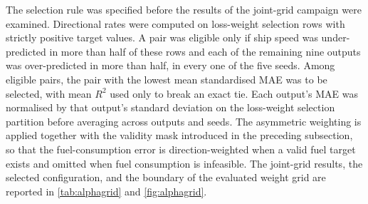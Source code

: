 \documentclass[final,5p,times,twocolumn,numbers]{elsarticle}
\begin{document}
The selection rule was specified before the results of the joint-grid campaign were examined. Directional rates were computed on loss-weight selection rows with strictly positive target values. A pair was eligible only if ship speed was under-predicted in more than half of these rows and each of the remaining nine outputs was over-predicted in more than half, in every one of the five seeds. Among eligible pairs, the pair with the lowest mean standardised MAE was to be selected, with mean $R^2$ used only to break an exact tie. Each output's MAE was normalised by that output's standard deviation on the loss-weight selection partition before averaging across outputs and seeds. The asymmetric weighting is applied together with the validity mask introduced in the preceding subsection, so that the fuel-consumption error is direction-weighted when a valid fuel target exists and omitted when fuel consumption is infeasible. The joint-grid results, the selected configuration, and the boundary of the evaluated weight grid are reported in \autoref{tab:alphagrid} and \autoref{fig:alphagrid}.
\end{document}
